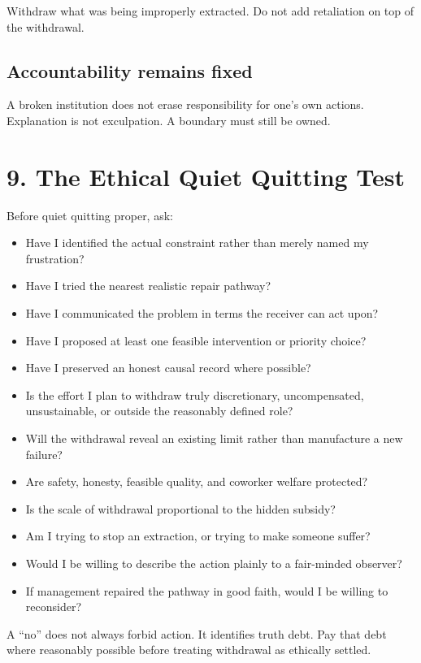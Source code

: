 \documentclass[11pt,oneside]{article}
\providecommand{\tightlist}{%
  \setlength{\itemsep}{0.22em}\setlength{\parskip}{0pt}}
\begin{document}
Withdraw what was being improperly extracted. Do not add retaliation on top of the withdrawal.

\subsection{Accountability remains fixed}\label{accountability-remains-fixed}

A broken institution does not erase responsibility for one's own actions. Explanation is not exculpation. A boundary must still be owned.

\section{9. The Ethical Quiet Quitting Test}\label{the-ethical-quiet-quitting-test}

Before quiet quitting proper, ask:

\begin{itemize}
\tightlist
\item
  Have I identified the actual constraint rather than merely named my frustration?
\item
  Have I tried the nearest realistic repair pathway?
\item
  Have I communicated the problem in terms the receiver can act upon?
\item
  Have I proposed at least one feasible intervention or priority choice?
\item
  Have I preserved an honest causal record where possible?
\item
  Is the effort I plan to withdraw truly discretionary, uncompensated, unsustainable, or outside the reasonably defined role?
\item
  Will the withdrawal reveal an existing limit rather than manufacture a new failure?
\item
  Are safety, honesty, feasible quality, and coworker welfare protected?
\item
  Is the scale of withdrawal proportional to the hidden subsidy?
\item
  Am I trying to stop an extraction, or trying to make someone suffer?
\item
  Would I be willing to describe the action plainly to a fair-minded observer?
\item
  If management repaired the pathway in good faith, would I be willing to reconsider?
\end{itemize}

A ``no'' does not always forbid action. It identifies truth debt. Pay that debt where reasonably possible before treating withdrawal as ethically settled.
\end{document}
